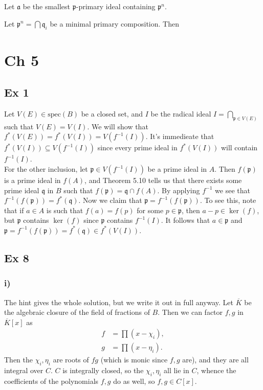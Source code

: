 \documentclass{article}
\theoremstyle{definition}
\newcommand{\spec}{\text{spec}}
\begin{document}
Let $\mathfrak{a}$ be the smallest $\mathfrak{p}$-primary ideal containing
$\mathfrak{p}^{n}$.

Let $\mathfrak{p}^n = \bigcap \mathfrak{q}_i$ be a minimal primary composition.
Then 

\section*{Ch 5}

\subsection*{Ex 1}

Let $V(E) \in \spec(B)$ be a closed set, and $I$ be the radical ideal $I =
\bigcap_{\mathfrak{p} \in V(E)}$ such that $V(E) = V(I)$. We will show that
$f^{*}(V(E)) = f^{*}(V(I)) = V(f^{-1}(I))$. It's immedieate that $f^{*}(V(I))
\subseteq V(f^{-1}(I)) $ since every prime ideal in $f^{*}(V(I))$ will contain
$f^{-1}(I)$. \\

For the other inclusion, let $\mathfrak{p} \in V(f^{-1}(I))$ be a prime ideal
in $A$. Then $f(\mathfrak{p})$ is a prime ideal in $f(A)$, and Theorem 5.10
tells us that there exists some prime ideal $\mathfrak{q}$ in $B$ such that
$f(\mathfrak{p}) = \mathfrak{q} \cap f(A)$. By applying $f^{-1}$ we see that
$f^{-1}(f(\mathfrak{p})) = f^{*}(\mathfrak{q})$. Now we claim that
$\mathfrak{p} = f^{-1}(f(\mathfrak{p}))$. To see this, note that if $a \in A$
is such that $f(a) = f(p)$ for some $p \in \mathfrak{p}$, then $a - p \in
\ker(f)$, but $\mathfrak{p}$ contains $\ker(f)$ since $\mathfrak{p}$ contains
$f^{-1}(I)$. It follows that $a \in \mathfrak{p}$ and $\mathfrak{p} =
f^{-1}(f(\mathfrak{p})) = f^{*}(\mathfrak{q}) \in f^{*}(V(I))$.


\subsection*{Ex 8}

\subsubsection*{i)}

The hint gives the whole solution, but we write it out in full anyway. Let
$\overline{K}$ be the algebraic closure of the field of fractions of $B$. Then
we can factor $f, g$ in $\overline{K}[x]$ as
\begin{align*}
	f &= \prod (x - \chi_i), \\
	g &= \prod (x - \eta_i).
\end{align*}
Then the $\chi_i, \eta_i$ are roots of $fg$ (which is monic since $f, g$ are),
and they are all integral over $C$. $C$ is integrally closed, so the $\chi_i,
\eta_i$ all lie in $C$, whence the coefficients of the polynomials $f, g$ do as
well, so $f, g \in C[x]$.
\end{document}
